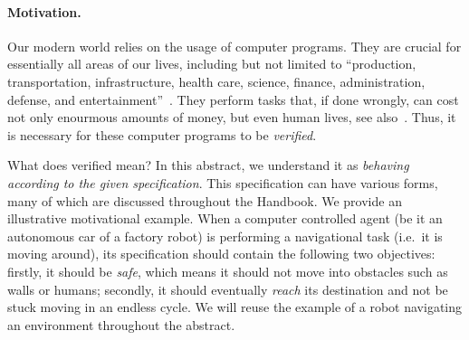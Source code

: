 \documentclass[11pt]{article}
\begin{document}
\paragraph{Motivation.}
Our modern world relies on the usage of computer programs. They are crucial for essentially all areas of our lives, including but not limited to ``production, transportation, infrastructure, health care, science, finance, administration, defense, and entertainment''~\cite[Page 2]{handbook}.
They perform tasks that, if done wrongly, can cost not only enourmous amounts of money, but even human lives, see also~\cite[Chapter 1]{BK08}.
Thus, it is necessary for these computer programs to be \emph{verified}.

What does verified mean?
In this abstract, we understand it as \emph{behaving according to the given specification}.
This specification can have various forms, many of which are discussed throughout the Handbook.
We provide an illustrative motivational example. 
When a computer controlled agent (be it an autonomous car of a factory robot) is performing a navigational task (i.e.\ it is moving around), its specification should contain the following two objectives: firstly, it should be \emph{safe}, which means it should not move into obstacles such as walls or humans; secondly, it should eventually \emph{reach} its destination and not be stuck moving in an endless cycle.
We will reuse the example of a robot navigating an environment throughout the abstract.
\end{document}
